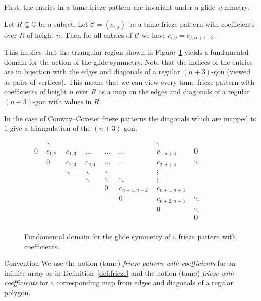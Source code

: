 \documentclass[ALCO,ThmDefs,Unicode,epreuves,published]{cedram}
\numberwithin{equation}{section}
\begin{document}
First, the entries in a tame frieze pattern are invariant under a glide symmetry.

\begin{prop} \label{thm:glide}
Let $R\subseteq \mathbb{C}$ be a subset.
Let $\mathcal{C}=(c_{i,j})$ be a tame frieze pattern with coefficients over $R$ of height
$n$. Then for all entries of $\mathcal{C}$ we have
$c_{i,j} = c_{j,n+i+3}.
$
\end{prop}


This implies that
the triangular region shown
in Figure~\ref{fig:glide} yields 
a fundamental domain for the action of the glide symmetry.
Note that the indices of the entries
are in bijection with the edges and diagonals of a regular $(n+3)$-gon (viewed as pairs of vertices). This means that we can view every tame 
frieze pattern with coefficients of height $n$ over $R$ as a map on the edges and
diagonals of a regular $(n+3)$-gon with values in $R$.

In the case of Conway--Coxeter frieze patterns the diagonals 
which are mapped to $1$ give a triangulation of the $(n+3)$-gon. 

\begin{figure}[htb]\centering
$
\begin{array}{ccccccccc}
& ~~ & ~\ddots~ & ~ & ~~ & ~~ & ~ & \ddots~ & ~\\ 
& ~0~ & ~c_{1,2}~ & ~c_{1,3}~ & ~\ldots~ & ~\ldots~ & ~\ldots~ & ~c_{1,n+3}~ & ~0~ \\ 
& & ~0~ & ~c_{2,3}~ & ~c_{2,4}~ & ~\ldots~ & ~\ldots~ & ~c_{2,n+3}~ & ~\ddots~ \\
& & & ~\ddots~ & ~\ddots~ & ~\ddots~ & ~~ & ~\vdots~ & ~ \\
& & & ~~ & ~\ddots~ & ~\ddots~ & ~\ddots~ & ~\vdots~ & ~\\
& & & ~~ & ~~ & ~0~ & ~c_{n+1,n+2}~ & ~c_{n+1,n+3}~ & ~\\
& & & ~~ & ~~ & ~~ & ~0~ & ~c_{n+2,n+3}~ & ~ \ddots \\
& & & ~~ & ~~ & ~~ & ~~ & ~0~ & ~\ddots \\
& & & ~~ & ~~ & ~~ & ~~ & ~~ & ~0~ \\
\end{array}
$

\caption{Fundamental domain for the glide symmetry of a frieze pattern
with coefficients.\label{fig:glide}}
\end{figure}


\begin{enonce*}[remark]{Convention} 
We use the notion (tame) {\em frieze pattern with coefficients} for an infinite array 
as in Definition~\ref{def:frieze} and the notion (tame) {\em frieze with coefficients} 
for a corresponding map from edges and diagonals of a regular polygon. 
\end{enonce*}
\end{document}
